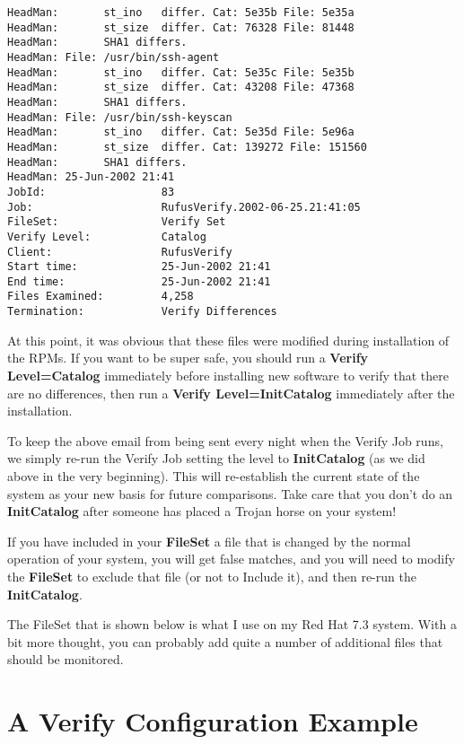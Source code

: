 \begin{verbatim}
HeadMan:       st_ino   differ. Cat: 5e35b File: 5e35a
HeadMan:       st_size  differ. Cat: 76328 File: 81448
HeadMan:       SHA1 differs.
HeadMan: File: /usr/bin/ssh-agent
HeadMan:       st_ino   differ. Cat: 5e35c File: 5e35b
HeadMan:       st_size  differ. Cat: 43208 File: 47368
HeadMan:       SHA1 differs.
HeadMan: File: /usr/bin/ssh-keyscan
HeadMan:       st_ino   differ. Cat: 5e35d File: 5e96a
HeadMan:       st_size  differ. Cat: 139272 File: 151560
HeadMan:       SHA1 differs.
HeadMan: 25-Jun-2002 21:41
JobId:                  83
Job:                    RufusVerify.2002-06-25.21:41:05
FileSet:                Verify Set
Verify Level:           Catalog
Client:                 RufusVerify
Start time:             25-Jun-2002 21:41
End time:               25-Jun-2002 21:41
Files Examined:         4,258
Termination:            Verify Differences
\end{verbatim}
\normalsize

At this point, it was obvious that these files were modified during
installation of the RPMs. If you want to be super safe, you should run a {\bf
Verify Level=Catalog} immediately before installing new software to verify
that there are no differences, then run a {\bf Verify Level=InitCatalog}
immediately after the installation. 

To keep the above email from being sent every night when the Verify Job runs,
we simply re-run the Verify Job setting the level to {\bf InitCatalog} (as we
did above in the very beginning). This will re-establish the current state of
the system as your new basis for future comparisons. Take care that you don't
do an {\bf InitCatalog} after someone has placed a Trojan horse on your
system! 

If you have included in your {\bf FileSet} a file that is changed by the
normal operation of your system, you will get false matches, and you will need
to modify the {\bf FileSet} to exclude that file (or not to Include it), and
then re-run the {\bf InitCatalog}. 

The FileSet that is shown below is what I use on my Red Hat 7.3 system. With a
bit more thought, you can probably add quite a number of additional files that
should be monitored. 

\section{A Verify Configuration Example}

